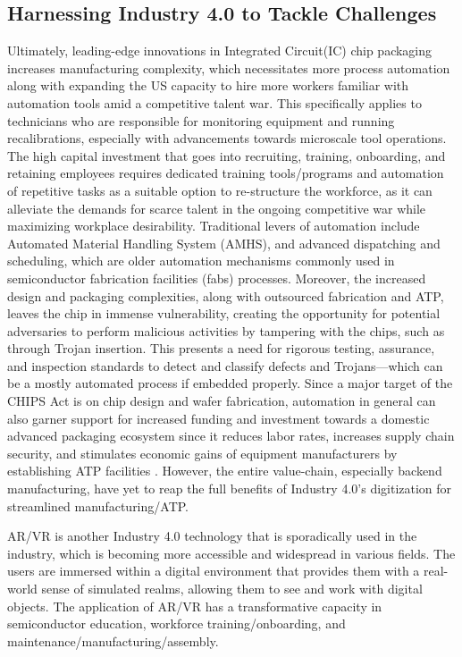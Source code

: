 \subsection{Harnessing Industry 4.0 to Tackle Challenges }\label{sec2_2:harnessing_industry_4.0_to_tackle_challenges}
Ultimately, leading-edge innovations in Integrated Circuit(IC) chip packaging increases manufacturing complexity, which necessitates more process automation along with expanding the US capacity to hire more workers familiar with automation tools amid a competitive talent war. This specifically applies to technicians who are responsible for monitoring equipment and running recalibrations, especially with advancements towards microscale tool operations. The high capital investment that goes into recruiting, training, onboarding, and retaining employees requires dedicated training tools/programs and automation of repetitive tasks as a suitable option to re-structure the workforce, as it can alleviate the demands for scarce talent in the ongoing competitive war while maximizing workplace desirability. Traditional levers of automation include Automated Material Handling System (AMHS), and advanced dispatching and scheduling, which are older automation mechanisms commonly used in semiconductor fabrication facilities (fabs) processes. Moreover, the increased design and packaging complexities, along with outsourced fabrication and ATP, leaves the chip in immense vulnerability, creating the opportunity for potential adversaries to perform malicious activities by tampering with the chips, such as through Trojan insertion. This presents a need for rigorous testing, assurance, and inspection standards to detect and classify defects and Trojans—which can be a mostly automated process if embedded properly. Since a major target of the CHIPS Act is on chip design and wafer fabrication, automation in general can also garner support for increased funding and investment towards a domestic advanced packaging ecosystem since it reduces labor rates, increases supply chain security, and stimulates economic gains of equipment manufacturers by establishing ATP facilities \cite{Ver_Wey2022-qv}. However, the entire value-chain, especially backend manufacturing, have yet to reap the full benefits of Industry 4.0’s digitization for streamlined manufacturing/ATP. 

AR/VR is another Industry 4.0 technology that is sporadically used in the industry, which is becoming more accessible and widespread in various fields. The users are immersed within a digital environment that provides them with a real-world sense of simulated realms, allowing them to see and work with digital objects. The application of AR/VR has a transformative capacity in semiconductor education, workforce training/onboarding, and maintenance/manufacturing/assembly.

